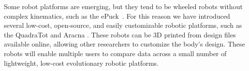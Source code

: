 Some robot platforms are emerging, but they tend to be wheeled robots
without complex kinematics, such as the ePuck~\citep{mondada2009puck}.
For this reason we have introduced several low-cost, open-source, and
easily customizable robotic platforms, such as the QuadraTot
\citep{yosinski2011evolving-robot-gaits} and Aracna
\citep{lohmann2012aracna-an-open-source-quadruped}. These robots can
be 3D printed from design files available online, allowing other
researchers to customize the body's design.  These robots will enable
multiple users to compare data across a small number of lightweight,
low-cost evolutionary robotic platforms.
